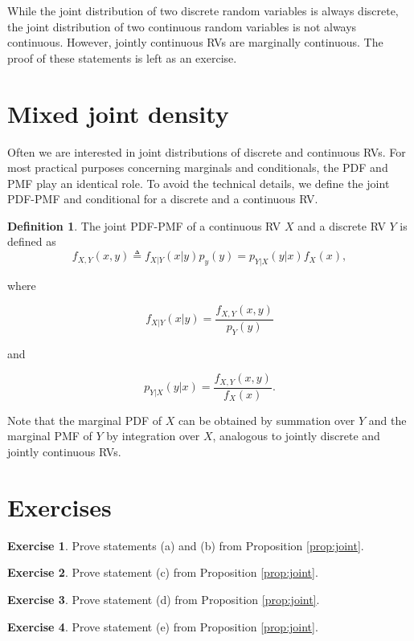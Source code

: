 \documentclass{book}
\theoremstyle{plain}%
\theoremstyle{definition}
\newtheorem{definition}{Definition}[section]
\newtheorem{exercise}{Exercise}[chapter]
\begin{document}
While the joint distribution of two discrete random variables is always discrete, the joint distribution of two continuous random variables is not always continuous. However, jointly continuous RVs are marginally continuous. The proof of these statements is left as an exercise.

\section{Mixed joint density}

Often we are interested in joint distributions of discrete and continuous RVs. For most practical purposes concerning marginals and conditionals, the PDF and PMF play an identical role. To avoid the technical details, we define the joint PDF-PMF and conditional for a discrete and a continuous RV.

\begin{definition}
The joint PDF-PMF of a continuous RV $X$ and a discrete RV $Y$ is defined as
$$f_{X,Y}(x,y) \triangleq f_{X|Y}(x|y)p_y(y) = p_{Y|X}(y|x)f_X(x),$$

where 

$$f_{X|Y}(x|y) = \frac{f_{X,Y}(x, y)}{p_Y(y)}$$

and

$$p_{Y|X}(y|x) = \frac{f_{X,Y}(x, y)}{f_X(x)}.$$

\end{definition}

Note that the marginal PDF of $X$ can be obtained by summation over $Y$ and the marginal PMF of $Y$ by integration over $X$, analogous to jointly discrete and jointly continuous RVs.
\section*{Exercises}

\begin{exercise}
Prove statements (a) and (b) from Proposition \ref{prop:joint}.
\end{exercise}

\begin{exercise}
Prove statement (c) from Proposition \ref{prop:joint}.
\end{exercise}

\begin{exercise}
Prove statement (d) from Proposition \ref{prop:joint}.
\end{exercise}

\begin{exercise}
Prove statement (e) from Proposition \ref{prop:joint}.
\end{exercise}
\end{document}
